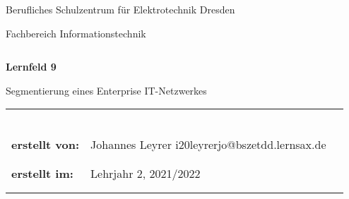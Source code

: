 \documentclass[a4paper,12pt,headings=small,ngerman,bibliography=totoc]{scrartcl}
\begin{document}
\pagestyle{empty}


\begin{center}
  \Large{Berufliches Schulzentrum für Elektrotechnik Dresden}\\
\end{center}

\begin{center}
  \Large{Fachbereich Informationstechnik}
\end{center}
\begin{verbatim}

\end{verbatim}
\begin{center}
  \textbf{\LARGE{Lernfeld 9}}
\end{center}

\begin{center}
  \Large{Segmentierung eines Enterprise IT-Netzwerkes}
\end{center}

\begin{flushleft}
  \begin{tabular}{lll}
                           &                                                            & \\
                           &                                                            & \\
                           &                                                            & \\
                           &                                                            & \\
                           &                                                            & \\
                           &                                                            & \\
    \textbf{erstellt von:} & Johannes Leyrer \flq{}i20leyrerjo@bszetdd.lernsax.de\frq{}   \\
                           &                                                            & \\
                           &                                                            & \\
    \textbf{erstellt im:}  & Lehrjahr 2, 2021/2022                                        \\
                           &                                                            & \\
                           &                                                            & \\
  \end{tabular}
\end{flushleft}
\end{document}
